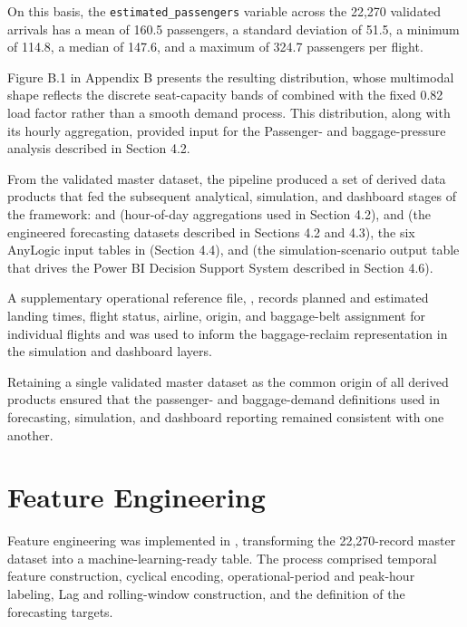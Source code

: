 On this basis, the \texttt{estimated\_passengers} variable across the 22,270 validated arrivals has a mean of 160.5 passengers, a standard deviation of 51.5, a minimum of 114.8, a median of 147.6, and a maximum of 324.7 passengers per flight.

Figure B.1 in Appendix B presents the resulting distribution, whose multimodal shape reflects the discrete seat-capacity bands of  combined with the fixed 0.82 load factor rather than a smooth demand process. This distribution, along with its hourly aggregation, provided input for the Passenger- and baggage-pressure analysis described in Section 4.2.

From the validated master dataset, the pipeline produced a set of derived data products that fed the subsequent analytical, simulation, and dashboard stages of the framework:  and  (hour-of-day aggregations used in Section 4.2),  and  (the engineered forecasting datasets described in Sections 4.2 and 4.3), the six AnyLogic input tables in  (Section 4.4), and  (the simulation-scenario output table that drives the Power BI Decision Support System described in Section 4.6).

A supplementary operational reference file, , records planned and estimated landing times, flight status, airline, origin, and baggage-belt assignment for individual flights and was used to inform the baggage-reclaim representation in the simulation and dashboard layers.

Retaining a single validated master dataset as the common origin of all derived products ensured that the passenger- and baggage-demand definitions used in forecasting, simulation, and dashboard reporting remained consistent with one another.

\section{Feature Engineering}
\label{sec:feature-engineering}

Feature engineering was implemented in
,
transforming the 22,270-record master dataset into a machine-learning-ready table.
The process comprised temporal feature construction, cyclical encoding,
operational-period and peak-hour labeling, Lag and rolling-window construction,
and the definition of the forecasting targets.

